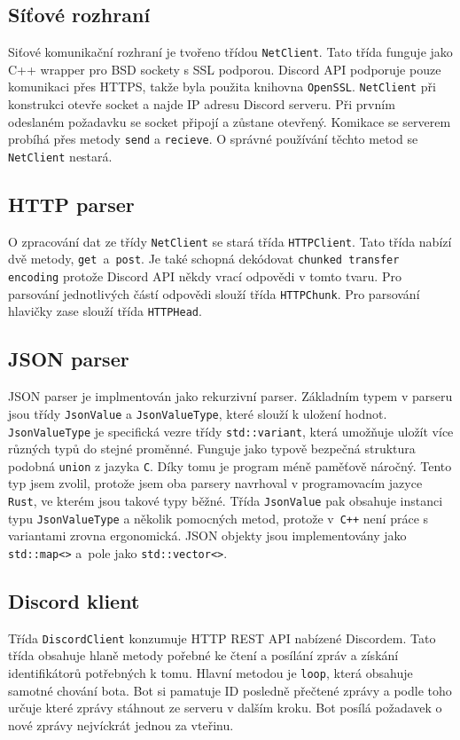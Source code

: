 \documentclass[a4paper,10pt]{article}
\begin{document}
\subsection{Síťové rozhraní}
Siťové komunikační rozhraní je tvořeno třídou \verb|NetClient|. Tato třída funguje jako C++ wrapper pro BSD sockety s SSL podporou. Discord API podporuje pouze komunikaci přes HTTPS, takže byla použita knihovna \verb|OpenSSL|. \verb|NetClient| při konstrukci otevře socket a najde IP adresu Discord serveru. Při prvním odeslaném požadavku se socket připojí a zůstane otevřený. Komikace se serverem probíhá přes metody \verb|send| a \verb|recieve|. O správné používání těchto metod se \verb|NetClient| nestará.

\subsection{HTTP parser}
O zpracování dat ze třídy \verb|NetClient| se stará třída \verb|HTTPClient|. Tato třída nabízí dvě metody, \verb|get|~a~\verb|post|. Je také schopná dekódovat \verb|chunked transfer encoding| protože Discord API někdy vrací odpovědi v tomto tvaru. Pro parsování jednotlivých částí odpovědi slouží třída \verb|HTTPChunk|. Pro parsování hlavičky zase slouží třída \verb|HTTPHead|.
\pagebreak
\subsection{JSON parser}
JSON parser je implmentován jako rekurzivní parser. Základním typem v parseru jsou třídy \verb|JsonValue| a \verb|JsonValueType|, které slouží k uložení hodnot. \verb|JsonValueType| je specifická vezre třídy \verb|std::variant|, která umožňuje uložít více různých typů do stejné proměnné. Funguje jako typově bezpečná struktura podobná \verb|union| z jazyka \verb|C|. Díky tomu je program méně paměťově náročný. Tento typ jsem zvolil, protože jsem  oba parsery navrhoval v programovacím jazyce \verb|Rust|, ve kterém jsou takové typy běžné. Třída \verb|JsonValue| pak obsahuje instanci typu \verb|JsonValueType| a několik pomocných metod, protože v~\verb|C++| není práce s variantami zrovna ergonomická. JSON objekty jsou implementovány jako \verb|std::map<>| a~pole jako \verb|std::vector<>|. 

\subsection{Discord klient}
Třída \verb|DiscordClient| konzumuje HTTP REST API nabízené Discordem. Tato třída obsahuje hlaně metody pořebné ke čtení a posílání zpráv a získání identifikátorů potřebných k tomu. Hlavní metodou je \verb|loop|, která obsahuje samotné chování bota. Bot si pamatuje ID posledně přečtené zprávy a podle toho určuje které zprávy stáhnout ze serveru v dalším kroku. Bot posílá požadavek o nové zprávy nejvíckrát jednou za vteřinu.
\end{document}
